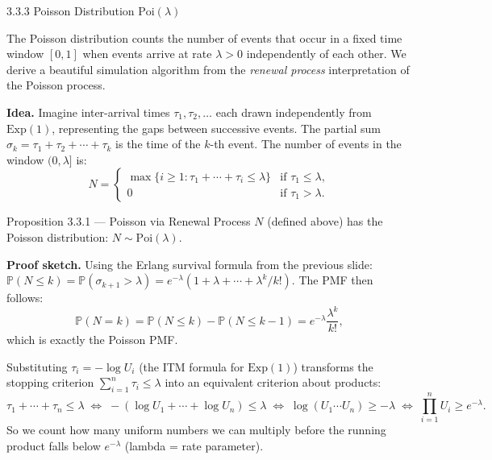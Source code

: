 \documentclass[aspectratio=169,10pt]{beamer}
\newcommand{\PP}{\mathbb{P}}
\begin{document}
\begin{frame}[allowframebreaks]{3.3.3 Poisson Distribution $\mathrm{Poi}(\lambda)$}

The Poisson distribution counts the number of events that occur in a fixed
time window $[0,1]$ when events arrive at rate $\lambda > 0$ independently
of each other.  We derive a beautiful simulation algorithm from the
\emph{renewal process} interpretation of the Poisson process.

\textbf{Idea.}  Imagine inter-arrival times $\tau_1, \tau_2, \ldots$ each
drawn independently from $\mathrm{Exp}(1)$, representing the gaps between
successive events.  The partial sum $\sigma_k = \tau_1 + \tau_2 + \cdots + \tau_k$
is the time of the $k$-th event.  The number of events in the window $(0, \lambda]$
is:
\[
  N = \begin{cases}
    \max\{i \ge 1 : \tau_1 + \cdots + \tau_i \le \lambda\} & \text{if } \tau_1 \le \lambda, \\
    0 & \text{if } \tau_1 > \lambda.
  \end{cases}
\]

\begin{block}{Proposition 3.3.1 --- Poisson via Renewal Process}
  $N$ (defined above) has the Poisson distribution: $N \sim \mathrm{Poi}(\lambda)$.
\end{block}

\textbf{Proof sketch.}  Using the Erlang survival formula from the previous slide:
$\PP(N \le k) = \PP(\sigma_{k+1} > \lambda) = e^{-\lambda}(1 + \lambda + \cdots + \lambda^k/k!)$.
The PMF then follows:
\[
  \PP(N = k) = \PP(N \le k) - \PP(N \le k-1)
    = e^{-\lambda}\frac{\lambda^k}{k!},
\]
which is exactly the Poisson PMF.

\framebreak

Substituting $\tau_i = -\log U_i$ (the ITM formula for $\mathrm{Exp}(1)$)
transforms the stopping criterion $\sum_{i=1}^n \tau_i \le \lambda$ into an
equivalent criterion about products:
\[
  \tau_1 + \cdots + \tau_n \le \lambda
  \;\iff\;
  -(\log U_1 + \cdots + \log U_n) \le \lambda
  \;\iff\;
  \log(U_1 \cdots U_n) \ge -\lambda
  \;\iff\;
  \prod_{i=1}^{n} U_i \ge e^{-\lambda}.
\]
So we count how many uniform numbers we can multiply before the running product
falls below $e^{-\lambda}$ (lambda = rate parameter).


\end{frame}
\end{document}
